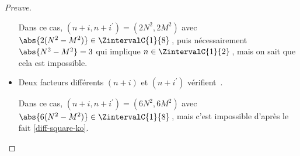 \begin{proof}[Preuve]
\begin{itemize}
		\smallskip
		\noindent
		Dans ce cas, $(n+i, n+i^\prime) = (2 N^2, 2 M^2)$ avec $\abs{2(N^2 - M^2)} \in \ZintervalC{1}{8}$\,, puis nécessairement $\abs{N^2 - M^2} = 3$ qui implique $n \in \ZintervalC{1}{2}$\,, mais on sait que cela est impossible.


    	\medskip
		\item Deux facteurs différents $(n+i)$ et $(n+i^\prime)$ vérifient \,.
		
		\smallskip
		\noindent
		Dans ce cas, $(n+i, n+i^\prime) = (6 N^2, 6 M^2)$ avec $\abs{6(N^2 - M^2)} \in \ZintervalC{1}{8}$\,, mais c'est impossible d'après le fait \ref{diff-square-ko}.
		\qedhere
    \end{itemize}
\end{proof}

